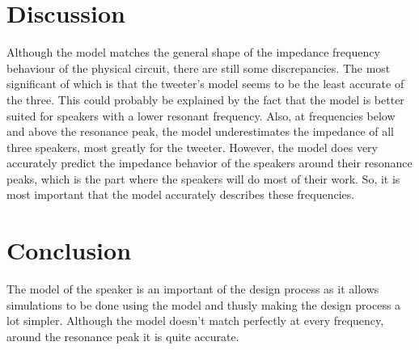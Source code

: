 \section{Discussion}
Although the model matches the general shape of the impedance frequency behaviour of the physical circuit, there are still some discrepancies. The most significant of which is that the tweeter's model seems to be the least accurate of the three. This could probably be explained by the fact that the model is better suited for speakers with a lower resonant frequency. Also, at frequencies below and above the resonance peak, the model underestimates the impedance of all three speakers, most greatly for the tweeter.
However, the model does very accurately predict the impedance behavior of the speakers around their resonance peaks, which is the part where the speakers will do most of their work. So, it is most important that the model accurately describes these frequencies. 

\section{Conclusion}
The model of the speaker is an important of the design process as it allows simulations to be done using the model and thusly making the design process a lot simpler. Although the model doesn't match perfectly at every frequency, around the resonance peak it is quite accurate. 